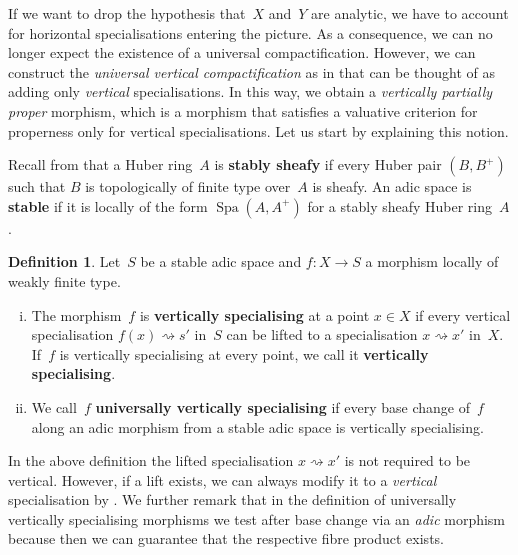 \documentclass[a4paper,twoside,11pt,reqno]{amsart}
\DeclareMathOperator{\Spa}{Spa}
\theoremstyle{definition}
\newtheorem{defi}[thm]{Definition}
\numberwithin{equation}{subsection}
\begin{document}
If we want to drop the hypothesis that~$X$ and~$Y$ are analytic, we have to account for horizontal specialisations entering the picture.
As a consequence, we can no longer expect the existence of a universal compactification.
However, we can construct the \emph{universal vertical compactification} as in \cite{Solodov-vertical-compactification} that can be thought of as adding only \emph{vertical} specialisations.
In this way, we obtain a \emph{vertically partially proper} morphism, which is a morphism that satisfies a valuative criterion for properness only for vertical specialisations.
Let us start by explaining this notion.

Recall from \cite[Definitions~8.26 and~8.54]{Wedhorn-adicspaces} that a Huber ring~$A$ is {\bf stably sheafy} if every Huber pair $(B,B^+)$ such that $B$ is topologically of finite type over~$A$ is sheafy.
An adic space is {\bf stable} if it is locally of the form $\Spa(A,A^+)$ for a stably sheafy Huber ring~$A$.

\begin{defi}
    Let~$S$ be a stable adic space and $f \colon X \to S$ a morphism locally of weakly finite type. 
    \begin{enumerate}[(i)]
        \item The morphism~$f$ is {\bf vertically specialising} at a point $x \in X$ if every vertical specialisation $f(x) \rightsquigarrow s'$ in~$S$ can be lifted to a specialisation $x \rightsquigarrow x'$ in~$X$.
        If~$f$ is vertically specialising at every point, we call it {\bf vertically specialising}.
        \item We call~$f$ {\bf universally vertically specialising} if every base change of~$f$ along an adic  morphism from a stable adic space is vertically specialising.
    \end{enumerate}
\end{defi}

In the above definition the lifted specialisation $x \rightsquigarrow x'$ is not required to be vertical.
However, if a lift exists, we can always modify it to a \emph{vertical} specialisation by \cite[Proposition~3.4]{Solodov-vertical-compactification}.
We further remark that in the definition of universally vertically specialising morphisms we test after base change via an \emph{adic} morphism because then we can guarantee that the respective fibre product exists.
\end{document}
